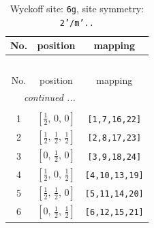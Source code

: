 \documentclass[fleqn,8pt]{jsarticle}
\begin{document}
\renewcommand{\arraystretch}{1.2}
\begin{longtable}{ccc}
\caption{Wyckoff site: {\tt 6g}, site symmetry: {\tt 2'/m'..}}
 \\
 \hline \hline
No. & position & mapping \\ \hline \endfirsthead

\multicolumn{2}{l}{\tablename\ \thetable{}} \\
 \hline \hline
No. & position & mapping \\ \hline \endhead

 \hline \hline
\multicolumn{2}{r}{\footnotesize\it continued ...} \\ \endfoot

 \hline \hline
\multicolumn{2}{r}{} \\ \endlastfoot

1 & $\left[ \frac{1}{2},\, 0,\, 0 \right]$ & {\tt [1,7,16,22]} \\ \hline
2 & $\left[ \frac{1}{2},\, \frac{1}{2},\, \frac{1}{2} \right]$ & {\tt [2,8,17,23]} \\ \hline
3 & $\left[ 0,\, \frac{1}{2},\, 0 \right]$ & {\tt [3,9,18,24]} \\ \hline
4 & $\left[ \frac{1}{2},\, 0,\, \frac{1}{2} \right]$ & {\tt [4,10,13,19]} \\ \hline
5 & $\left[ \frac{1}{2},\, \frac{1}{2},\, 0 \right]$ & {\tt [5,11,14,20]} \\ \hline
6 & $\left[ 0,\, \frac{1}{2},\, \frac{1}{2} \right]$ & {\tt [6,12,15,21]} \\
\end{longtable}
\renewcommand{\arraystretch}{1.2}
\end{document}
